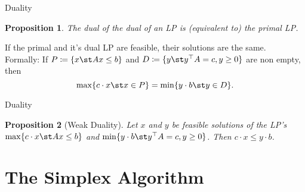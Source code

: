 \documentclass[a4paper, x11names, svgnames]{beamer}
\theoremstyle{definition}
\theoremstyle{plain}
\newtheorem*{prop}{Proposition}
\theoremstyle{plain}
\begin{document}
\begin{frame}{Duality}
    \begin{prop}
        The dual of the dual of an LP is (equivalent to) the primal LP.
    \end{prop}
    \pause
    \begin{theorem}
        If the primal and it's dual LP are feasible, their solutions are the same. \\
        Formally: If $P\coloneqq\{x\st Ax\leq b\}$ and $D\coloneqq\{y\st y^\top A=c, y\geq 0\}$ are non empty,
        then \[\max\{c\cdot x\st x\in P\}=\min\{y\cdot b\st y\in D\}.\]
    \end{theorem}
\end{frame}

\begin{frame}{Duality}
    \begin{prop}[Weak Duality]
        Let $x$ and $y$ be feasible solutions of the LP's $\max\{c\cdot x \st Ax \leq b\}$
        and $\min\{y\cdot b\st y^\top A = c, y\geq 0\}$. %
        Then $c\cdot x \leq y \cdot b$.
    \end{prop}
\end{frame}


\section[Simplex]{The Simplex Algorithm}

%
\end{document}
